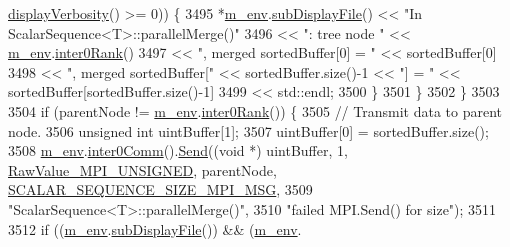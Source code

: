 \begin{DoxyCode}
      \hyperlink{class_q_u_e_s_o_1_1_base_environment_a1fe5f244fc0316a0ab3e37463f108b96}{displayVerbosity}() >= 0)) \{
3495         *\hyperlink{class_q_u_e_s_o_1_1_scalar_sequence_a71618cd6351b29361b437af68447a4c8}{m\_env}.\hyperlink{class_q_u_e_s_o_1_1_base_environment_a8a0064746ae8dddfece4229b9ad374d6}{subDisplayFile}() << \textcolor{stringliteral}{"In ScalarSequence<T>::parallelMerge()"}
3496                                 << \textcolor{stringliteral}{": tree node "}                                              << 
      \hyperlink{class_q_u_e_s_o_1_1_scalar_sequence_a71618cd6351b29361b437af68447a4c8}{m\_env}.\hyperlink{class_q_u_e_s_o_1_1_base_environment_ae106b5bb8a80b655b88b3a26b1e7c185}{inter0Rank}()
3497                                 << \textcolor{stringliteral}{", merged sortedBuffer[0] = "}                               << 
      sortedBuffer[0]
3498                                 << \textcolor{stringliteral}{", merged sortedBuffer["} << sortedBuffer.size()-1 << \textcolor{stringliteral}{"] = "} << 
      sortedBuffer[sortedBuffer.size()-1]
3499                                 << std::endl;
3500       \}
3501     \}
3502   \}
3503 
3504   \textcolor{keywordflow}{if} (parentNode != \hyperlink{class_q_u_e_s_o_1_1_scalar_sequence_a71618cd6351b29361b437af68447a4c8}{m\_env}.\hyperlink{class_q_u_e_s_o_1_1_base_environment_ae106b5bb8a80b655b88b3a26b1e7c185}{inter0Rank}()) \{
3505     \textcolor{comment}{// Transmit data to parent node.}
3506     \textcolor{keywordtype}{unsigned} \textcolor{keywordtype}{int} uintBuffer[1];
3507     uintBuffer[0] = sortedBuffer.size();
3508     \hyperlink{class_q_u_e_s_o_1_1_scalar_sequence_a71618cd6351b29361b437af68447a4c8}{m\_env}.\hyperlink{class_q_u_e_s_o_1_1_base_environment_a689e4d140c74d495d97eb498714a4b82}{inter0Comm}().\hyperlink{class_q_u_e_s_o_1_1_mpi_comm_a1ecdbeac992a2ab1ff12e45e0c1b53b4}{Send}((\textcolor{keywordtype}{void} *) uintBuffer, 1, 
      \hyperlink{_mpi_comm_8h_a06cbfbc33436f6e0dc8a48ff3c49bdfc}{RawValue\_MPI\_UNSIGNED}, parentNode, 
      \hyperlink{_scalar_sequence_8h_ab861df57b68ddbaa21de47a2955f1c86}{SCALAR\_SEQUENCE\_SIZE\_MPI\_MSG},
3509                             \textcolor{stringliteral}{"ScalarSequence<T>::parallelMerge()"},
3510                             \textcolor{stringliteral}{"failed MPI.Send() for size"});
3511 
3512     \textcolor{keywordflow}{if} ((\hyperlink{class_q_u_e_s_o_1_1_scalar_sequence_a71618cd6351b29361b437af68447a4c8}{m\_env}.\hyperlink{class_q_u_e_s_o_1_1_base_environment_a8a0064746ae8dddfece4229b9ad374d6}{subDisplayFile}()) && (\hyperlink{class_q_u_e_s_o_1_1_scalar_sequence_a71618cd6351b29361b437af68447a4c8}{m\_env}.

\end{DoxyCode}
